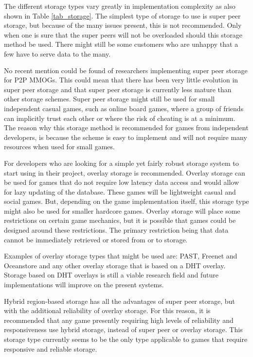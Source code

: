 The different storage types vary greatly in implementation complexity as also shown in Table \ref{tab_storage}. The simplest type of storage to use
is super peer storage, but because of the many issues present, this is not recommended. Only when one is sure that the super peers will not be
overloaded should this storage method be used. There might still be some customers who are unhappy that a few have to serve data to the many.

No recent mention could be found of researchers implementing super peer storage for P2P MMOGs. This could mean that there has been very little
evolution in super peer storage and that super peer storage is currently less mature than other storage schemes. Super peer storage might still be
used for small independent casual games, such as online board games, where a group of friends can implicitly trust each other or where the risk of
cheating is at a minimum. The reason why this storage method is recommended for games from independent developers, is because the scheme is easy to
implement and will not require many resources when used for small games.

For developers who are looking for a simple yet fairly robust storage system to start using in their project, overlay storage is recommended. Overlay
storage can be used for games that do not require low latency data access and would allow for lazy updating of the database. These games will be
lightweight casual and social games. But, depending on the game implementation itself, this storage type might also be used for smaller hardcore
games. Overlay storage will place some restrictions on certain game mechanics, but it is possible that games could be designed around these
restrictions. The primary restriction being that data cannot be immediately retrieved or stored from or to storage.

Examples of overlay storage types that might be used are: PAST, Freenet and Oceanstore and any other overlay storage that is based on a DHT overlay.
Storage based on DHT overlays is still a viable research field and future implementations will improve on the present systems.

Hybrid region-based storage has all the advantages of super peer storage, but with the additional reliability of overlay storage. For this reason, it
is recommended that any game presently requiring high levels of reliability and responsiveness use hybrid storage, instead of super peer or overlay
storage. This storage type currently seems to be the only type applicable to games that require responsive and reliable storage.

